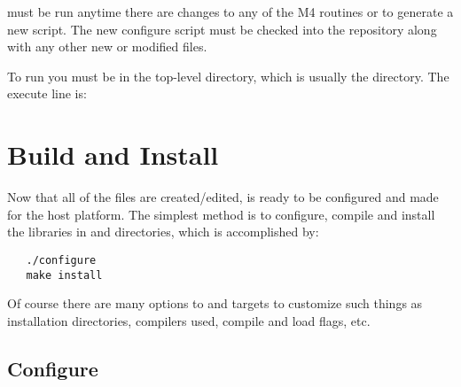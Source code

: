  must be run anytime there are changes to any of the M4 routines
or  to generate a new  script.  The new configure
script must be checked into the \hypre{} repository along with any other new or
modified files.

To run  you must be in the top-level directory, which is usually the
 directory.  The execute line is:  

\section{Build and Install}
\label{Build and Install}


Now that all of the files are created/edited, \hypre{} is ready to be configured
and made for the host platform.  The simplest method is to configure, compile and
install the libraries in  and  directories, which is
accomplished by:
\begin{verbatim}
   ./configure
   make install
\end{verbatim}

Of course there are many options to  and  targets to 
customize such things as installation directories, compilers used, compile and
load flags, etc.  

\subsection{Configure}
\label{Configure}


